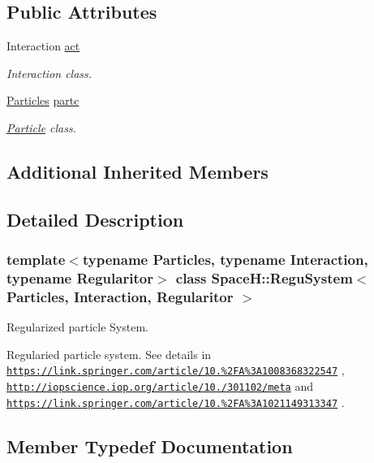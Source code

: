 \subsection*{Public Attributes}
\begin{DoxyCompactItemize}
\item 
Interaction \mbox{\hyperlink{class_space_h_1_1_regu_system_a9fa9c5d8996d8574f7fdd0b201f3383e}{act}}
\begin{DoxyCompactList}\small\item\em Interaction class. \end{DoxyCompactList}\item 
\mbox{\hyperlink{struct_space_h_1_1_particles}{Particles}} \mbox{\hyperlink{class_space_h_1_1_regu_system_aa82364f412d9de96503478f116b7b77b}{partc}}
\begin{DoxyCompactList}\small\item\em \mbox{\hyperlink{struct_space_h_1_1_particle}{Particle}} class. \end{DoxyCompactList}\end{DoxyCompactItemize}
\subsection*{Additional Inherited Members}


\subsection{Detailed Description}
\subsubsection*{template$<$typename Particles, typename Interaction, typename Regularitor$>$\newline
class Space\+H\+::\+Regu\+System$<$ Particles, Interaction, Regularitor $>$}

Regularized particle System. 

Regularied particle system. See details in \href{https://link.springer.com/article/10.1023%2FA%3A1008368322547}{\tt https\+://link.\+springer.\+com/article/10.\+1023\%2\+F\+A\%3\+A1008368322547} , \href{http://iopscience.iop.org/article/10.1086/301102/meta}{\tt http\+://iopscience.\+iop.\+org/article/10.\+1086/301102/meta} and \href{https://link.springer.com/article/10.1023%2FA%3A1021149313347}{\tt https\+://link.\+springer.\+com/article/10.\+1023\%2\+F\+A\%3\+A1021149313347} . 

\subsection{Member Typedef Documentation}
\mbox{\label{class_space_h_1_1_regu_system_ad65166badb7cec65669212f7b61489a6}} 
